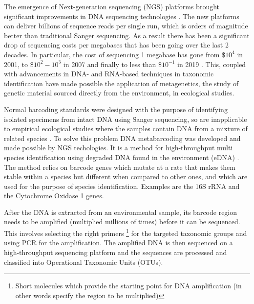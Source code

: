 The emergence of Next-generation sequencing (NGS) platforms brought significant improvements in DNA sequencing technologies \cite{shendure_next-generation_2008}. The new platforms can deliver billions of sequence reads per single run, which is orders of magnitude better than traditional Sanger sequencing. As a result there has been a significant drop of sequencing costs per megabases that has been going over the last 2 decades. In particular, the cost of sequencing 1 megabase has gone from \$$10^4$ in 2001, to \$$10^2 - 10^3$ in 2007 and finally to less than \$$10^{-1}$ in 2019 \cite{sequencing_costs}. This, coupled with advancements in DNA- and RNA-based techniques in taxonomic identification \cite{baird_biomonitoring_2012} have made possible the application of metagenetics, the study of genetic material sourced directly from the environment, in ecological studies. 

Normal barcoding standards were designed with the purpose of identifying isolated specimens from intact DNA using Sanger sequencing, so are inapplicable to empirical ecological studies where the samples contain DNA from a mixture of related species \cite{taberlet_towards_2012}. To solve this problem DNA metabarcoding was developed and made possible by NGS techologies. It is a method for high-throughput multi species identification using degraded DNA found in the environment (eDNA) \cite{taberlet_towards_2012}. The method relies on barcode genes which mutate at a rate that makes them stable within a species but different when compared to other ones, and which are used for the purpose of species identification. Examples are the 16S rRNA and the Cytochrome Oxidase 1 \cite{hebert_paul_d._n._biological_2003} genes. 

After the DNA is extracted from an environmental sample, its barcode region needs to be amplified (multiplied millions of times) before it can be sequenced. This involves selecting the right primers \footnote{Short molecules which provide the starting point for DNA amplification (in other words specify the region to be multiplied)} for the targeted taxonomic groups and using PCR for the amplification. The amplified DNA is then sequenced on a high-throughput sequencing platform and the sequences are processed and classified into Operational Taxonomic Units (OTUs). 

